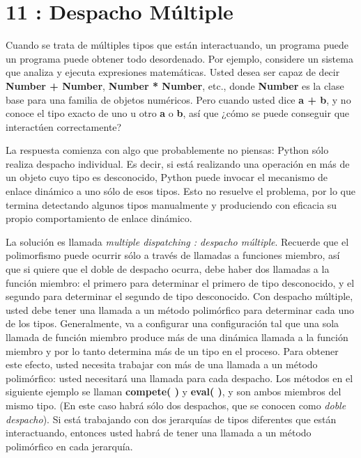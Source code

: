 \documentclass{article}
\begin{document}
\section{11 : Despacho Múltiple}

Cuando se trata de múltiples tipos que están interactuando, un programa puede un programa puede obtener todo desordenado. Por ejemplo, considere un sistema que analiza y ejecuta expresiones matemáticas. Usted desea ser capaz de decir \textbf{Number + Number}, \textbf{Number * Number}, etc., donde \textbf{Number} es la clase base para una familia de objetos numéricos. Pero cuando usted dice \textbf{a + b}, y no conoce el tipo exacto de uno u otro \textbf{a} o \textbf{b}, así que ¿cómo se puede conseguir que interactúen correctamente?  \newline

La respuesta comienza con algo que probablemente no piensas: Python sólo realiza despacho individual. Es decir, si está realizando una operación en más de un objeto cuyo tipo es desconocido, Python puede invocar el mecanismo de enlace dinámico a uno sólo de esos tipos. Esto no resuelve el problema, por lo que termina detectando algunos tipos manualmente y produciendo con eficacia su propio comportamiento de enlace dinámico.   \newline

La solución es llamada \textit{multiple dispatching : despacho múltiple}. Recuerde que el polimorfismo puede ocurrir sólo a través de llamadas a funciones miembro, así que si quiere que el doble de despacho ocurra, debe haber dos llamadas a la función miembro: el primero para determinar el primero de tipo desconocido, y el segundo para determinar el segundo de tipo desconocido. Con despacho múltiple, usted debe tener una llamada a un método polimórfico para determinar cada uno de los tipos. Generalmente, va a configurar una configuración tal que una sola llamada de función miembro produce más de una dinámica llamada a la función miembro y por lo tanto determina más de un tipo en el proceso. Para obtener este efecto, usted necesita trabajar con más de una llamada a un método polimórfico: usted necesitará una llamada para cada despacho. Los métodos en el siguiente ejemplo se llaman \textbf{compete( )} y \textbf{eval( )}, y son ambos miembros del mismo tipo. (En este caso habrá sólo dos despachos, que se conocen como \textit{doble despacho}). Si está trabajando con dos jerarquías de tipos diferentes que están interactuando, entonces usted habrá de tener una llamada a un método polimórfico en cada jerarquía.  \newline
\end{document}
